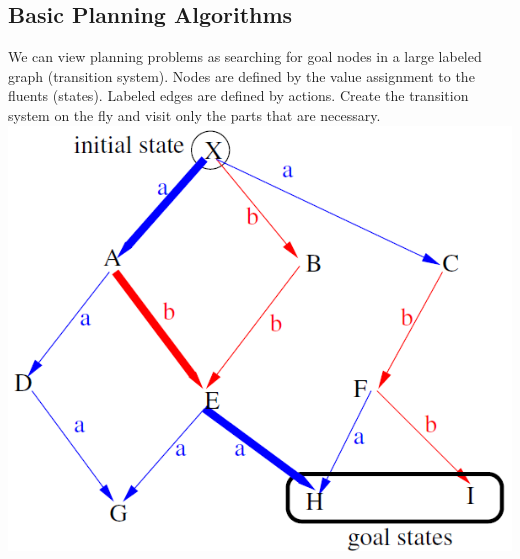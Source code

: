 \documentclass{article}
\begin{document}
\subsection{Basic Planning Algorithms}
We can view planning problems as searching for goal nodes in a large labeled graph (transition system). Nodes are defined by the value assignment to the fluents (states). Labeled edges are defined by actions. Create the transition system on the fly and visit only the parts that are necessary.\\
\includegraphics[scale=0.6]{55.png}\\\\
\end{document}
